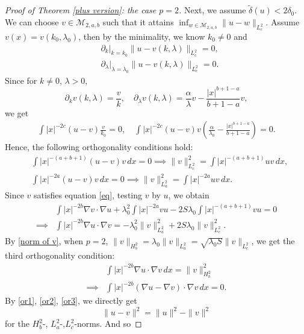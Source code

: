\documentclass[11pt]{article}
\numberwithin{equation}{section}
\begin{document}
\begin{proof}[Proof of Theorem \ref{plus version}: the case $p=2$]
    Next, we assume $\tilde{\delta}(u)<2\delta_0$. We can choose $v\in\mathcal{M}_{2,a,b}$ such that it attains $\inf_{w\in\mathcal{M}_{2,a,b}} \|u-w\|_{L_c^2}$. Assume $v(x) = v(k_0,\lambda_0)$, then by the minimality, we know $k_0\neq 0$ and
    \begin{align*}
        & \partial_{k}\big|_{k=k_0}\|u-v(k,\lambda)\|_{L^2_c} = 0,  \\
        & \partial_{\lambda}\big|_{\lambda=\lambda_0}\|u-v(k,\lambda)\|_{L^2_c} = 0.
    \end{align*}
    Since for $k\neq 0,\,\lambda>0$,
    \[  \partial_k v(k,\lambda) = \frac{v}{k},\quad \partial_\lambda v(k,\lambda) = \frac{\alpha}{\lambda}v-\frac{|x|^{b+1-a}}{b+1-a}v,\]
    we get
    \begin{align*}
        \int |x|^{-2c}(u-v)\frac{v}{k_0} = 0,\quad \int |x|^{-2c}(u-v)v\left(\frac{\alpha}{\lambda_0} - \frac{|x|^{b+1-a}}{b+1-a}\right) =0.
    \end{align*}
    Hence, the following orthogonality conditions hold:
    \begin{align}
        & \int |x|^{-(a+b+1)}(u-v)v\,dx = 0 \implies \|v\|_{L^2_c}^2 = \int |x|^{-(a+b+1)}uv\,dx , \label{or1}\\
        & \int |x|^{-2a} (u-v)v\,dx =0 \implies \|v\|_{L^2_a}^2 = \int |x|^{-2a}uv\,dx. \label{or2}
    \end{align}
    Since $v$ satisfies equation \eqref{eq}, testing $v$ by $u$, we obtain
    \begin{align*}
        & \int |x|^{-2b}\nabla v\cdot\nabla u + \lambda_0^2 \int |x|^{-2a}vu - 2S\lambda_0 \int |x|^{-(a+b+1)}vu = 0 \\
        \implies{}& \int |x|^{-2b}\nabla u\cdot\nabla v = -\lambda_0^2\|v\|_{L^2_a}^2 + 2S\lambda_0\|v\|_{L^2_c}^2.
    \end{align*}
    By \eqref{norm of v}, when $p=2$, $\|v\|_{H^2_b} = \lambda_0\|v\|_{L^2_a} = \sqrt{\lambda_0 S}\|v\|_{L^2_c}$, we get the third orthogonality condition:
    \begin{equation}\label{or3}
        \begin{aligned}
            & \int |x|^{-2b}\nabla u\cdot \nabla v \,dx = \|v\|_{H^2_b}^2 \\
        \implies{}& \int |x|^{-2b} (\nabla u-\nabla v)\cdot\nabla v\,dx=0.
        \end{aligned}
    \end{equation}
    By \eqref{or1}, \eqref{or2}, \eqref{or3}, we directly get
    \[ \|u-v\|^2 = \|u\|^2 - \|v\|^2 \]
    for the $H^2_b$-, $L^2_a$-,$L^2_c$-norms. And so

\end{proof}
\end{document}
